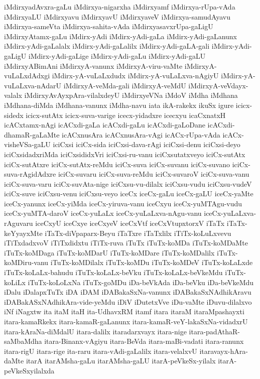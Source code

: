 {iMdirxyadAvxra-gaLu
iMdirxya-nigarxha
iMdirxyamf
iMdirxya-rUpa-vAda
iMdirxyaLU
iMdirxyavu
iMdirxyavU
iMdirxyaveV
iMdirxya-samudAyavu
iMdirxya-sameVta
iMdirxya-sahita-vAda
iMdirxyasavxrUpa-gaLigU
iMdirxyAtamx-gaLu
iMdirx-yAdi
iMdirx-yAdi-gaLa
iMdirx-yAdi-gaLanunx
iMdirx-yAdi-gaLalalx
iMdirx-yAdi-gaLalilx
iMdirx-yAdi-gaLA-gali
iMdirx-yAdi-gaLigU
iMdirx-yAdi-gaLige
iMdirx-yAdi-gaLu
iMdirx-yAdi-gaLU
iMdirxyABimAni
iMdirxyA-vanunx
iMdirxyA-viru-vaMte
iMdirxyA-vuLaLxdAdxgi
iMdirx-yA-vuLaLxdudx
iMdirx-yA-vuLaLxva-nAgiyU
iMdirx-yA-vuLaLxva-nAdarU
iMdirxyA-veMda-gali
iMdirxyA-veMdU
iMdirxyA-veVdayx-valalx
iMdirxyAvAyxpAra-vilalxdeyU
iMdirxyeVNa
iMdoV
iMdha
iMdhana
iMdhana-diMda
iMdhana-vanunx
iMdha-navu
iata
ikA-rakekx
ikuSx
igure
icicx-sidedx
icicx-sutAtx
icicx-suva-varige
icecx-yidadxre
icecxyu
icaCxnatxH
icACxtamx-nAgi
icACxdi-gaLa
icACxdi-gaLu
icACxdi-gaLoDane
icACxdi-dhamaR-gaLaMte
icACxnusAra
icACxnusAra-vAgi
icACx-rUpa-vAda
icACx-visheVSa-gaLU
iciCxsi
iciCx-sida
iciCxsi-dava-rAgi
iciCxsi-denu
iciCxsi-deyo
iciCxsidadxriMda
iciCxsididxVri
iciCxsi-ru-vanu
iciCxsutatxveyo
iciCx-sutAtx
iciCx-sutAtxre
iciCx-sutAtx-reMdu
iciCx-suva
iciCx-suvanu
iciCx-suvano
iciCx-suva-rAgidAdxre
iciCx-suvaru
iciCx-suva-reMdu
iciCx-suvaroV
iciCx-suva-vanu
iciCx-suva-varu
iciCx-suvAta-nige
iciCxsu-vu-dilalx
iciCxsu-vudu
iciCxsu-vudeV
iciCx-suve
iciCxsu-venu
iciCxsu-veyo
iceCx
iceCx-gaLu
iceCx-gaLU
iceCx-yaMte
iceCx-yanunx
iceCx-yiMda
iceCx-yiruva-vanu
iceCxyu
iceCx-yuMTAgu-vudu
iceCx-yuMTA-daroV
iceCx-yuLaLx
iceCx-yuLaLxva-nAgu-vanu
iceCx-yuLaLxva-rAguvaru
iceCxyU
iceCxye
iceCxyeV
iceCxVtf
iceCxVtupxtorxV
iTaTx
iTaTx-keYyayxMte
iTaTx-diVpaparx-Beyu
iTaTxre
iTaTxlilx
iTiTx-koLuLxvevu
iTiTxdadxvoV
iTiTxdidxtu
iTiTx-ruva
iTuTx
iTuTx-koMDa
iTuTx-koMDaMte
iTuTx-koMDaga
iTuTx-koMDarU
iTuTx-koMDare
iTuTx-koMDalilx
iTuTx-koMDiru-vanu
iTuTx-koMDilalx
iTuTx-koMDu
iTuTx-koMDeV
iTuTx-koLaLxde
iTuTx-koLaLx-bahudu
iTuTx-koLaLx-beVku
iTuTx-koLaLx-beVkeMdu
iTuTx-koLiLx
iTuTx-koLoLxNa
iTuTx-goMDu
iDa-beVkAda
iDa-beVku
iDa-beVkeMdu
iDalu
iDalapxTuTx
iDA
iDAM
iDABakaSxNa-vanunx
iDABakaSxNAdhikAravu
iDABakASxNAdhikAra-vide-yeMdu
iDiV
iDutetxVve
iDu-vaMte
iDuvu-dilalxvo
iNf
iNagxtw
ita
itaM
itaH
ita-UdhavxRM
itamf
itara
itaraM
itaraMpashayxti
itara-kamaRkekx
itara-kamaR-gaLanunx
itara-kamaR-veY-lakaSxNa-vidadxrU
itara-kAraNa-diMdalU
itara-dalilx
itaradarxvayx
itara-nige
itara-padAthaR-saMbaMdha
itara-Binanx-vAgiyu
itara-BeVda
itara-maBi-vadati
itara-ranunx
itara-rigU
itara-rige
ita-raru
itara-vAdi-gaLalilx
itara-velalxvU
itaravayx-hAra-daMte
itarA
itarAMsha-gaLu
itarAMsha-gaLU
itarA-peVkeSx-yilalx
itarA-peVkeSxyilalxda
}
